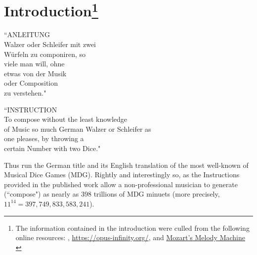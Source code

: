 \documentclass[letterpaper,x11names,svgnames,10pt]{article}
\begin{document}
{\section[Introduction]{Introduction\footnote{The information contained in the introduction were culled from the following online resources:
	\citet{wiki_mw2017},
	\url{https://opus-infinity.org/}, and \hyperlink{https://www.sciencenews.org/article/mozarts-melody-machine-0}{Mozart's Melody Machine} \citep*{peterson2001}
	}
}
	\begin{center}
	\begin{minipage}{0.4\textwidth}
	\begin{flushleft}
		\begin{center}
			``ANLEITUNG\\
			Walzer oder Schleifer mit zwei\\
			W\"{u}rfeln zu componiren, so\\
			viele man will, ohne\\
			etwas von der Musik\\
			oder Composition\\
			zu verstehen."\\
		\end{center}
	\end{flushleft}
	\end{minipage}
	\begin{minipage}{0.4\textwidth}
	\begin{flushright}
		\begin{center}
		``INSTRUCTION\\
		To compose without the least knowledge\\
		of Music so much German Walzer or Schleifer as\\
		one pleases, by throwing a\\
		certain Number with two Dice."
	\end{center}
	\end{flushright}
	\end{minipage}
	\end{center}

Thus run the German title and its English translation of the most well-known of Musical Dice Games (MDG).  Rightly and interestingly so, as the Instructions provided in the published work allow a non-professional musician to generate (``compose") as nearly as 398 trillions of MDG minuets (more precisely, $11^{14} = 397,749,833,583,241$).\\  

}
\end{document}
